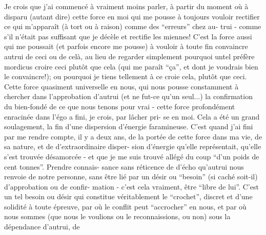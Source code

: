 Je crois que j'ai commencé à vraiment moins parler, à partir du moment
où à disparu (autant dire) cette force en moi qui me pousse à toujours vouloir
rectifier ce qui m'apparaît (à tort ou à raison) comme des ``erreurs'' chez au-\linebreak
trui - comme s'il n'était pas suffisant que je décèle et rectifie les miennes!
C'est la force aussi qui me poussait (et parfois encore me pousse) à vouloir
à toute fin convaincre autrui de ceci ou de celà, au lieu de regarder simplement
pourquoi untel préfère mordicus croire ceci plutôt que cela (qui me paraît ``ça'',
et dont je voudrais bien le convaincre!); ou pourquoi je tiens tellement à ce
 croie cela, plutôt que ceci. Cette force quasiment universelle en nous,
qui nous pousse constamment à chercher dans l'approbation d'autrui (et ne fut-ce
qu'un seul...) la confirmation du bien-fondé de ce que nous tenons pour vrai -
cette force profondément enracinée dans l'égo a fini, je crois, par lâcher pri-\linebreak
se en moi. Cela a été un grand soulagement, la fin d'une dispersion d'énergie
faramineuse. C'est quand j'ai fini par me rendre compte, il y a deux ans, de la
portée de cette force dans ma vie, de sa nature, et de d'extraordinaire disper-\linebreak
sion d'énergie qu'elle représentait, qu'elle s'est trouvée désamorcée - et que
je me suis trouvé allégé du coup ``d'un poids de cent tonnes''. Prendre connais-\linebreak
sance sans réticence de d'écho qu'autrui nous renvoie de notre personne, sans
être lié par un désir ou ``besoin'' (si caché soit-il) d'approbation ou de confir-\linebreak
mation - c'est cela vraiment, être ``libre de lui''. C'est un tel besoin ou désir
qui constitue véritablement le ``crochet'', discret et d'une solidité à toute
épreuve, par où le conflit peut ``accrocher'' en nous, et par où nous sommes (que
nous le voulions ou le reconnaissions, ou non) sous la dépendance d'autrui, de
\margin{\unsure{-}}


